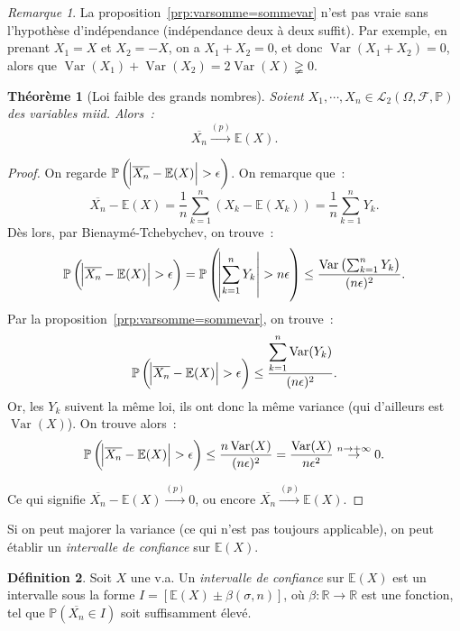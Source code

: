 \documentclass{article}
\newcommand{\E}{\mathbb E}
\renewcommand{\P}{\mathbb P}
\newcommand{\R}{\mathbb R}
\newcommand{\espproba}[3]{\left(#1, #2, #3\right)}  %
\newcommand{\Ofp}{\espproba \Omega{\mathcal F}\P}  %
\newcommand{\Ld}{\mathcal L_2\Ofp}  %
\newcommand{\Ces}{\overline}  %
\newcommand{\convp}{\stackrel {(p)}\to}  %
\DeclareMathOperator{\Var}{Var}
\newtheorem{thm}{Théorème}[section]
\theoremstyle{definition}
\newtheorem{déf}[thm]{Définition}
\theoremstyle{remark}
\newtheorem*{rmq}{Remarque}
\begin{document}
		\begin{rmq} La proposition~\ref{prp:varsomme=sommevar} n'est pas vraie sans l'hypothèse d'indépendance (indépendance deux à deux suffit). Par exemple,
		en prenant $X_1 = X$ et $X_2 = -X$, on a $X_1+X_2 = 0$, et donc $\Var(X_1+X_2) = 0$, alors que $\Var(X_1) + \Var(X_2) = 2\Var(X) \gneqq 0$. \end{rmq}

		\begin{thm}[Loi faible des grands nombres] Soient $X_1, \dotsb, X_n \in \Ld$ des variables miid. Alors~:
		\[\Ces {X_n} \convp \E(X).\]
		\end{thm}

		\begin{proof} On regarde $\P\left(\abs {\Ces {X_n} - \E(X)} > \epsilon\right)$. On remarque que~:
		\[\Ces {X_n} - \E(X) = \frac 1n\sum_{k=1}^n(X_k - \E(X_k)) = \frac 1n\sum_{k=1}^nY_k.\]
		Dès lors, par Bienaymé-Tchebychev, on trouve~:
		\[\P\left(\abs {\Ces {X_n} - \E(X)} > \epsilon\right) = \P\left(\abs {\sum_{k=1}^nY_k} > n\epsilon\right) \leq \frac {\Var\left(\sum_{k=1}^nY_k\right)}{(n\epsilon)^2}.\]
		Par la proposition~\ref{prp:varsomme=sommevar}, on trouve~:
		\[\P\left(\abs {\Ces {X_n} - \E(X)} > \epsilon\right) \leq \frac {\displaystyle \sum_{k=1}^n\Var(Y_k)}{(n\epsilon)^2}.\]
		Or, les $Y_k$ suivent la même loi, ils ont donc la même variance (qui d'ailleurs est $\Var(X)$). On trouve alors~:
		\[\P\left(\abs {\Ces {X_n} - \E(X)} > \epsilon\right) \leq \frac {n\Var(X)}{(n\epsilon)^2} = \frac {\Var(X)}{n\epsilon^2} \stackrel {n \to +\infty}\to 0.\]

		Ce qui signifie $\Ces {X_n} - \E(X) \convp 0$, ou encore $\Ces {X_n} \convp \E(X)$.
		\end{proof}

		Si on peut majorer la variance (ce qui n'est pas toujours applicable), on peut établir un \emph{intervalle de confiance} sur $\E(X)$.

		\begin{déf} Soit $X$ une v.a. Un \emph{intervalle de confiance} sur $\E(X)$ est un intervalle sous la forme $I = [\E(X) \pm \beta(\sigma, n)]$, où
		$\beta : \R \to \R$ est une fonction, tel que $\P(\Ces {X_n} \in I)$ soit suffisamment élevé. \end{déf}
\end{document}
